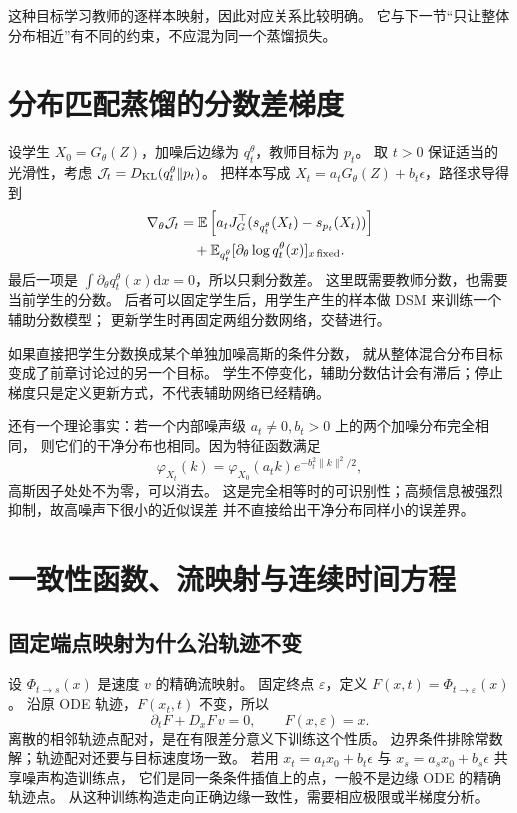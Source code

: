 这种目标学习教师的逐样本映射，因此对应关系比较明确。
它与下一节“只让整体分布相近”有不同的约束，不应混为同一个蒸馏损失。

\section{分布匹配蒸馏的分数差梯度}
设学生 $X_0=G_\theta(Z)$，加噪后边缘为 $q_t^\theta$，教师目标为 $p_t$。
取 $t>0$ 保证适当的光滑性，考虑
$\mathcal J_t=D_{\rm KL}(q_t^\theta\|p_t)$。
把样本写成 $X_t=a_tG_\theta(Z)+b_t\epsilon$，路径求导得到
\begin{align}
\nabla_\theta\mathcal J_t
 &=\mathbb E\left[a_tJ_G^\top(s_{q_t^\theta}(X_t)-s_{p_t}(X_t))\right]\\
 &\quad+\mathbb E_{q_t^\theta}[\partial_\theta\log q_t^\theta(x)]_{x\,\rm fixed}.
\end{align}
最后一项是 $\int\partial_\theta q_t^\theta(x)\mathrm dx=0$，所以只剩分数差。
这里既需要教师分数，也需要当前学生的分数。
后者可以固定学生后，用学生产生的样本做 DSM 来训练一个辅助分数模型；
更新学生时再固定两组分数网络，交替进行。\cite{dmd2,theorybook}

如果直接把学生分数换成某个单独加噪高斯的条件分数，
就从整体混合分布目标变成了前章讨论过的另一个目标。
学生不停变化，辅助分数估计会有滞后；停止梯度只是定义更新方式，不代表辅助网络已经精确。

还有一个理论事实：若一个内部噪声级 $a_t\ne0,b_t>0$ 上的两个加噪分布完全相同，
则它们的干净分布也相同。因为特征函数满足
\[
\varphi_{X_t}(k)=\varphi_{X_0}(a_tk)e^{-b_t^2\|k\|^2/2},
\]
高斯因子处处不为零，可以消去。
这是完全相等时的可识别性；高频信息被强烈抑制，故高噪声下很小的近似误差
并不直接给出干净分布同样小的误差界。

\section{一致性函数、流映射与连续时间方程}
\subsection{固定端点映射为什么沿轨迹不变}
设 $\Phi_{t\to s}(x)$ 是速度 $v$ 的精确流映射。
固定终点 $\varepsilon$，定义 $F(x,t)=\Phi_{t\to\varepsilon}(x)$。
沿原 ODE 轨迹，$F(x_t,t)$ 不变，所以
\[
\partial_tF+D_xF\,v=0,\qquad F(x,\varepsilon)=x.
\label{supp:consistency-pde}
\]
离散的相邻轨迹点配对，是在有限差分意义下训练这个性质。
边界条件排除常数解；轨迹配对还要与目标速度场一致。
若用 $x_t=a_tx_0+b_t\epsilon$ 与 $x_s=a_sx_0+b_s\epsilon$ 共享噪声构造训练点，
它们是同一条条件插值上的点，一般不是边缘 ODE 的精确轨迹点。
从这种训练构造走向正确边缘一致性，需要相应极限或半梯度分析。

